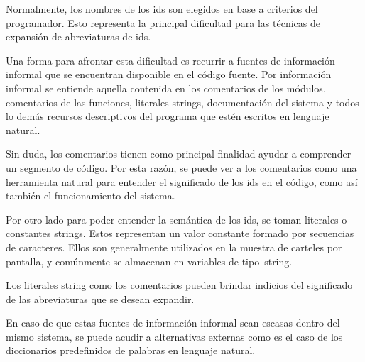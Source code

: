 \documentclass[a4paper,12pt]{report}
\begin{document}


Normalmente, los nombres de los ids son elegidos en base a criterios del programador\cite{LFBEX07, EHPV09}. Esto representa la principal dificultad para las técnicas de expansión de abreviaturas de ids.


Una forma para afrontar esta dificultad es recurrir a fuentes de información informal que se encuentran disponible en el código fuente. Por información informal se entiende aquella contenida en los comentarios de los módulos, comentarios de las funciones, literales strings, documentación del sistema y todos lo demás recursos descriptivos del programa que estén escritos en lenguaje natural.


Sin duda, los comentarios tienen como principal finalidad ayudar a comprender un segmento de código\cite{JDPH08}. Por esta razón, se puede ver a los comentarios como una herramienta natural para entender el significado de los ids en el código, como así también el funcionamiento del sistema.

Por otro lado para poder entender la semántica de los ids, se toman li\-terales o constantes strings.
Estos representan un valor constante formado por secuencias de caracteres. Ellos son generalmente utilizados en la muestra de carteles por pantalla, y comúnmente se almacenan en variables de \mbox{tipo string.}

Los literales string como los comentarios pueden brindar indicios del significado de las abreviaturas que se desean expandir.%

En caso de que estas fuentes de información informal sean escasas dentro del mismo sistema, se puede acudir a alternativas externas como es el caso de los diccionarios predefinidos de palabras en lenguaje natural.
\end{document}
